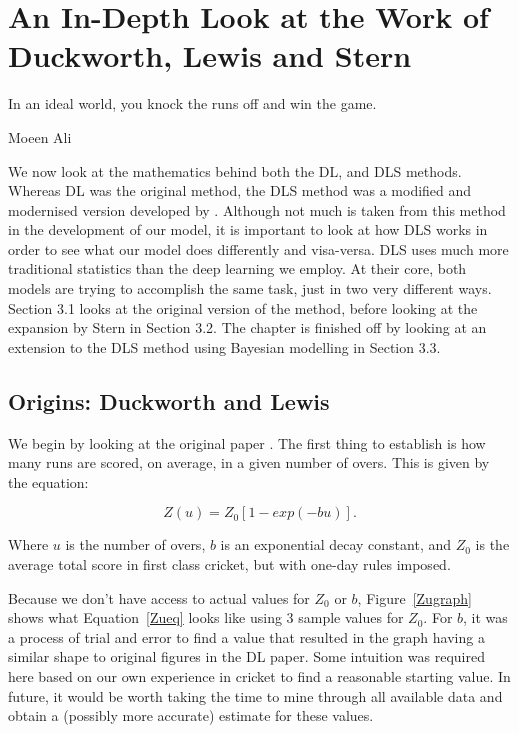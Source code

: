 \chapter{An In-Depth Look at the Work of Duckworth, Lewis and Stern}

\epigraph{In an ideal world, you knock the runs off and win the game.}{Moeen Ali}

We now look at the mathematics behind both the DL, and DLS methods. Whereas DL was the original
method, the DLS method was a modified and modernised version developed by \cite{stern}. Although not much is taken from this method 
in the development of our model, it is important to look at how DLS works in order to see what our model does differently 
and visa-versa. DLS uses much more traditional statistics than the deep learning we employ. At their core, both models are trying to accomplish 
the same task, just in two very different ways. \\

Section 3.1 looks at the original version of the method, before looking at the expansion by Stern in Section 3.2. The chapter is finished 
off by looking at an extension to the DLS method using Bayesian modelling in Section 3.3.

\section{Origins: Duckworth and Lewis}
We begin by looking at the original paper \cite{duckworth}. The first thing to establish is how many runs are scored,
on average, in a given number of overs. This is given by the equation:

\begin{equation}
    Z(u) = Z_0[1-exp(-bu)].
    \label{Zueq}  
\end{equation}

Where $u$ is the number of overs, $b$ is an exponential decay constant, and $Z_0$ is the
average total score in first class cricket, but with one-day rules imposed.  

Because we don't have access to actual values for $Z_0$ or $b$, Figure~\ref{Zugraph} shows what Equation~\ref{Zueq} looks 
like using 3 sample values for $Z_0$. For $b$, it was a process of trial and error to find a value
that resulted in the graph having a similar shape to original figures in the DL paper. Some intuition was required here 
based on our own experience in cricket to find a reasonable starting value. In future, it would be worth taking the time to 
mine through all available data and obtain a (possibly more accurate) estimate for these values. 


